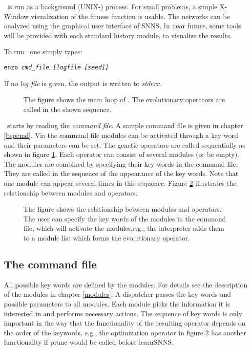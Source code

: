 \ENZO\  is run as a background (UNIX-) process. For small problems,
a simple X-Window visualization of the fitness function is usable.
The networks can be analyzed using the graphical user interface of SNNS.
In near future, some tools will be provided with each standard history
module, to visualize the results.

To run \ENZO\  one simply types:\\

	\centerline{\tt enzo \em cmd\_file [logfile [seed]]}

If no {\em log file} is given, the output is written to {\em stderr}.

\begin{figure}[htb]
\centerline{ }
{\small {\caption[Evolutionary algorithm ]{
\label{algo}
 The figure shows the main loop of \ENZO.
The evolutionary operators are called in the shown sequence.
}}}
\end{figure}


\ENZO\  starts by reading the {\em command file}. A sample command file is given in
chapter \ref{bspcmd}. Via the  command file modules
 can be activated through a key word
and their parameters can be set. 
The genetic operators are called sequentially as  shown in figure \ref{algo}.
Each operator  can consist of several  modules (or be empty).
The modules are combined by specifying their key words in the command file.
They are called in the sequence of the appearance of the key words.
Note that  one module can appear several times in this sequence.
Figure \ref{operator} illustrates the relationship between modules and operators.


\begin{figure}[htb]
\caption[Relationship between modules and operators]{ \label{operator}
{\small {The figure shows the relationship between modules and operators.
The user can specify the key words of the modules in the command file,
which will activate the modules,e.g., the interpreter adds them to a module
list which forms the evolutionary operator.}
}}
\end{figure}




\subsection{The command file \label{steuerdatei}}

All possible key words are defined by the modules. For details see
the description of the modules in chapter \ref{modules}.
A dispatcher passes the key words and possible parameters to
all modules. Each module picks the information it is interested in
and performs necessary actions.
The sequence of key words is only  important in the way
that the functionality of the resulting operator depends on
the order of the keywords, e.g., the optimization operator
in figure \ref{operator} has another functionality if prune would
be called before learnSNNS.

